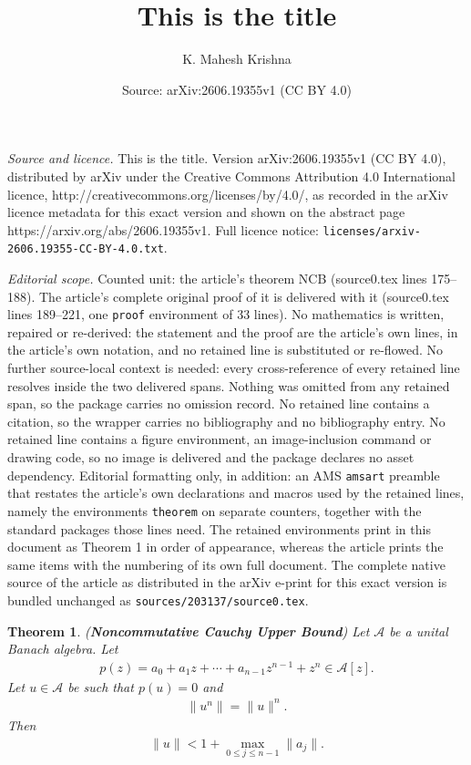 \documentclass[10pt,a4paper]{amsart}
\title{This is the title}
\author{K. Mahesh Krishna}
\date{Source: arXiv:2606.19355v1 (CC BY 4.0)}
\newtheorem{theorem}{Theorem}
\begin{document}
\maketitle

\noindent\emph{Source and licence.} This is the title. Version arXiv:2606.19355v1 (CC BY 4.0), distributed by arXiv under the Creative Commons Attribution 4.0 International licence, http://creativecommons.org/licenses/by/4.0/, as recorded in the arXiv licence metadata for this exact version and shown on the abstract page https://arxiv.org/abs/2606.19355v1. Full licence notice: \texttt{licenses/arxiv-2606.19355-CC-BY-4.0.txt}.\par\smallskip

\noindent\textit{Editorial scope.} Counted unit: the article's theorem NCB (source0.tex lines 175--188). The article's complete original proof of it is delivered with it (source0.tex lines 189--221, one \texttt{proof} environment of 33 lines). No mathematics is written, repaired or re-derived: the statement and the proof are the article's own lines, in the article's own notation, and no retained line is substituted or re-flowed.  No further source-local context is needed: every cross-reference of every retained line resolves inside the two delivered spans.  Nothing was omitted from any retained span, so the package carries no omission record.  No retained line contains a citation, so the wrapper carries no bibliography and no bibliography entry.  No retained line contains a figure environment, an image-inclusion command or drawing code, so no image is delivered and the package declares no asset dependency.  Editorial formatting only, in addition: an AMS \texttt{amsart} preamble that restates the article's own declarations and macros used by the retained lines, namely the environments \texttt{theorem} on separate counters, together with the standard packages those lines need.  The retained environments print in this document as Theorem 1 in order of appearance, whereas the article prints the same items with the numbering of its own full document.  The complete native source of the article as distributed in the arXiv e-print for this exact version is bundled unchanged as \texttt{sources/203137/source0.tex}.
\begin{theorem} \label{NCB}
(\textbf{Noncommutative Cauchy Upper Bound}) Let $\mathcal{A}$ be a unital Banach algebra. Let 
\begin{align*}
	p(z)=a_0+a_1z+\cdots+a_{n-1}z^{n-1}+z^n\in \mathcal{A}[z].
\end{align*}
Let $u \in \mathcal{A}$ be such that $p(u)=0$ and 
\begin{align}\label{E1}
	\|u^n\|=\|u\|^n.
\end{align}
 Then 
\begin{align*}
		\|u\|< 1+\max_{0\leq j \leq n-1}\|a_j\|.
\end{align*}
\end{theorem}
\end{document}
